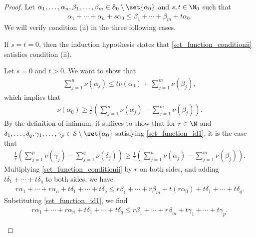 \documentclass[10pt]{mypackage2}
\begin{document}
\begin{proof}
  Let $\alpha_1,\dots,\alpha_n,\beta_1,\dots,\beta_m\in \mathcal{S}_0\setminus \set{\alpha_0}$ and $s,t\in \N_0$ such that
  \begin{align*}
    \alpha_1 + \cdots + \alpha_n + s\alpha_0 \leq \beta_1 + \cdots + \beta_m + t\alpha_0.\label{set_function_conditionii}\tag*{(\textasteriskcentered)}
  \end{align*}
  We will verify condition (ii) in the three following cases.
  \begin{description}[font=\normalfont\scshape,leftmargin=0cm]
    \item[Case 0:] If $s = t = 0$, then the induction hypothesis states that \ref{set_function_conditionii} satisfies condition (ii).
    \item[Case 1:] Let $s = 0$ and $t > 0$. We want to show that
      \begin{align*}
        \sum_{j=1}^{n}\nu\left(\alpha_j\right) \leq t\nu\left(\alpha_0\right) + \sum_{j=1}^{m}\nu\left(\beta_j\right),
      \end{align*}
      which implies that
      \begin{align*}
        \nu\left(\alpha_0\right) \geq \frac{1}{t}\left(\sum_{j=1}^{n}\nu\left(\alpha_j\right) - \sum_{j=1}^{m}\nu\left(\beta_j\right)\right).
      \end{align*}
      By the definition of infimum, it suffices to show that for $r\in \N$ and $\delta_1,\dots,\delta_q,\gamma_1,\dots,\gamma_p\in \mathcal{S}\setminus \set{\alpha_0}$ satisfying \ref{set_function_id1}, it is the case that
      \begin{align*}
        \frac{1}{r}\left(\sum_{j=1}^{p}\nu\left(\gamma_j\right)-\sum_{j=1}^{q}\nu\left(\delta_j\right)\right) \geq \frac{1}{t}\left(\sum_{j=1}^{n}\nu\left(\alpha_j\right) - \sum_{j=1}^{m}\nu\left(\beta_j\right)\right).
      \end{align*}
      Multiplying \ref{set_function_conditionii} by $r$ on both sides, and adding $t\delta_1 + \cdots + t\delta_q$ to both sides, we have
      \begin{align*}
        r\alpha_1 + \cdots + r\alpha_n + t\delta_1 + \cdots + t\delta_q \leq r\beta_1 + \cdots + r\beta_m + t\left(r\alpha_0\right) + t\delta_1 + \cdots + t\delta_q.
      \end{align*}
      Substituting \ref{set_function_id1}, we find
      \begin{align*}
        r\alpha_1 + \cdots + r\alpha_n + t\delta_1 + \cdots + t\delta_q \leq r\beta_1 + \cdots + r\beta_m + t\gamma_1 + \cdots + t\gamma_p.
      \end{align*}

\end{description}
\end{proof}
\end{document}
